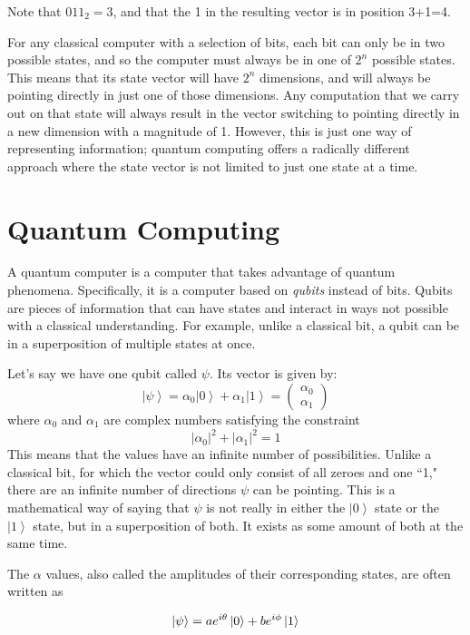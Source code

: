 \documentclass[11pt]{report}
\newcommand{\?}{\stackrel{?}{=}}
\begin{document}
Note that $011_2 = 3$, and that the 1 in the resulting vector is in position 3+1=4.

For any classical computer with a selection of bits, each bit can only be in two possible states, and so the computer must always be in one of $2^n$ possible states. This means that its state vector will have $2^n$ dimensions, and will always be pointing directly in just one of those dimensions. Any computation that we carry out on that state will always result in the vector switching to pointing directly in a new dimension with a magnitude of 1. However, this is just one way of representing information; quantum computing offers a radically different approach where the state vector is not limited to just one state at a time.

\section{Quantum Computing}
A quantum computer is a computer that takes advantage of quantum phenomena. Specifically, it is a computer based on \textit{qubits} instead of bits. Qubits are pieces of information that can have states and interact in ways not possible with a classical understanding. For example, unlike a classical bit, a qubit can be in a superposition of multiple states at once.

Let’s say we have one qubit called $\psi$. Its vector is given by:
$$ \left | \psi \right \rangle=\alpha _{0}\left | 0 \right \rangle+\alpha _{1}\left | 1 \right \rangle=\begin{pmatrix}\alpha_{0}\\ \alpha_{1}\end{pmatrix}$$
where $\alpha _{0}$ and $\alpha_{1}$ are complex numbers satisfying the constraint 
$$ \left | \alpha_{0} \right |^{2} + \left | \alpha_{1} \right |^{2}=1$$
This means that the  values have an infinite number of possibilities. Unlike a classical bit, for which the vector could only consist of all zeroes and one ``1," there are an infinite number of directions $\psi$ can be pointing. This is a mathematical way of saying that $\psi$ is not really in either the $\left | 0 \right \rangle$ state or the $\left | 1 \right \rangle$ state, but in a superposition of both. It exists as some amount of both at the same time.

The $\alpha$ values, also called the amplitudes of their corresponding states, are often written as

$$\ket{\psi} = ae^{i\theta}\ket{0} + be^{i\phi}\ket{1}$$
\end{document}
